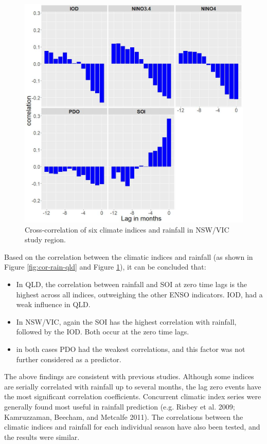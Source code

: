 \documentclass[]{elsarticle} %
\theoremstyle{definition}
\theoremstyle{definition}
\theoremstyle{definition}
\theoremstyle{remark}
\begin{document}
\begin{figure}
\includegraphics[width=0.9\linewidth]{figures/cor_nswvic} \caption{Cross-correlation of six climate indices and rainfall in NSW/VIC study region.}\label{fig:cor-rain-nsw}
\end{figure}

Based on the correlation between the climatic indices and rainfall (as
shown in Figure \ref{fig:cor-rain-qld} and Figure
\ref{fig:cor-rain-nsw}), it can be concluded that:

\begin{itemize}
  \setlength{\itemsep}{0cm}
  \setlength{\parskip}{0cm}
  \item In QLD, the correlation between rainfall and SOI at zero time lags is the highest across all indices, outweighing the other ENSO indicators. IOD, had a weak influence in QLD.
  \item In NSW/VIC, again the SOI has the highest correlation with rainfall, followed by the IOD. Both occur at the zero time lags. 
  \item in both cases PDO had the weakest correlations, and this factor was not further considered as a predictor.
\end{itemize}

The above findings are consistent with previous studies. Although some
indices are serially correlated with rainfall up to several months, the
lag zero events have the most significant correlation coefficients.
Concurrent climatic index series were generally found most useful in
rainfall prediction (e.g. Risbey et al. 2009; Kamruzzaman, Beecham, and
Metcalfe 2011). The correlations between the climatic indices and
rainfall for each individual season have also been tested, and the
results were similar.
\end{document}
